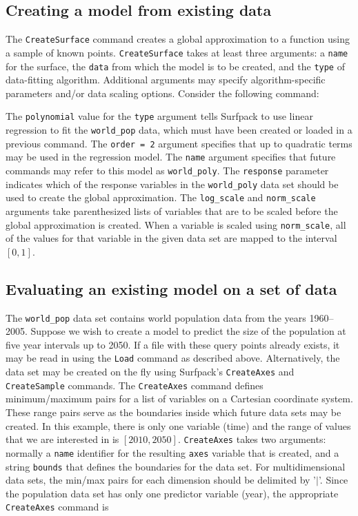 \documentclass{article}
\begin{document}
\subsection{Creating a model from existing data}\label{sec:create_surface}
The \texttt{CreateSurface} command creates a global approximation to a function using a sample of known points.  \texttt{CreateSurface} takes at least three
arguments: a \texttt{name} for the surface, the \texttt{data} from which the model is to be created, and the \texttt{type} of data-fitting algorithm.  Additional arguments may specify algorithm-specific parameters and/or data scaling options.  Consider the following command:

The \texttt{polynomial} value for the \texttt{type} argument tells Surfpack to use linear regression to fit the \texttt{world\_pop} data, which must have been created or loaded in a previous command.  The \texttt{order = 2} argument specifies that up to quadratic terms may be used in the regression model.  The \texttt{name} argument specifies that future commands may refer to this model as \texttt{world\_poly}.  The \texttt{response} parameter indicates which of the response variables in the \texttt{world\_poly} data set should be used to create the global approximation.  The \texttt{log\_scale} and \texttt{norm\_scale} arguments take parenthesized lists of variables that are to be scaled before the global approximation is created.  When a variable is scaled using \texttt{norm\_scale}, all of the values for that variable in the given data set are mapped to the interval $[0,1]$.

\subsection{Evaluating an existing model on a set of data}\label{sec:evaluate}

The \texttt{world\_pop} data set contains world population data from the years 1960--2005.  Suppose we wish to create a model to predict the size of the population at five year intervals up to 2050.  If a file with these query points already exists, it may be read in using the \texttt{Load} command as described above.  Alternatively, the data set may be created on the fly using Surfpack's \texttt{CreateAxes} and \texttt{CreateSample} commands.  The \texttt{CreateAxes} command defines minimum/maximum pairs for a list of variables on a Cartesian coordinate system.  These range pairs serve as the boundaries inside which future data sets may be created.  In this example, there is only one variable (time) and the range of values that we are interested in is $[2010,2050]$.  \texttt{CreateAxes} takes two arguments: normally a \texttt{name} identifier for the resulting \texttt{axes} variable that is created, and a string \texttt{bounds} that defines the boundaries for the data set.  For multidimensional data sets, the min/max pairs for each dimension should be delimited by '$|$'.  Since the population data set has only one predictor variable (year), the appropriate \texttt{CreateAxes} command is
\end{document}

